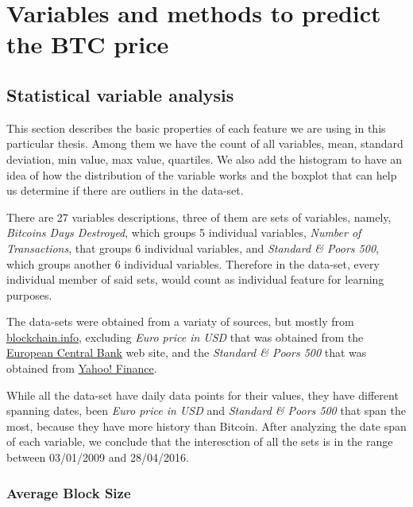 
\chapter{Variables and methods to predict the BTC price} %

\label{ch:variables}


\section{Statistical variable analysis}
\label{sec:stat-var-analysis}

This section describes the basic properties of each feature we are
using in this particular thesis. Among them we have the count of all
variables, mean, standard deviation, min value, max value, quartiles.
We also add the histogram to have an idea of how the distribution of
the variable works and the boxplot that can help us determine if there
are outliers in the data-set.

There are 27 variables descriptions, three of them are sets of
variables, namely, \textit{Bitcoins Days Destroyed}, which groups 5
individual variables, \textit{Number of Transactions}, that groups 6
individual variables, and \textit{Standard \& Poors 500}, which groups
another 6 individual variables. Therefore in the data-set, every
individual member of said sets, would count as individual feature for
learning purposes.

The data-sets were obtained from a variaty of sources, but mostly from
\href{https://blockchain.info/charts}{blockchain.info}, excluding
\textit{Euro price in USD} that was obtained from the
\href{https://www.ecb.europa.eu/stats/exchange/eurofxref/html/index.en.html}{European
  Central Bank} web site, and the \textit{Standard \& Poors 500} that
was obtained from
\href{https://finance.yahoo.com/q/hp?s=^GSPC\&a=00\&b=3\&c=1950\&d=05\&e=8\&f=2016\&g=d}{Yahoo!
  Finance}.

While all the data-set have daily data points for their values, they
have different spanning dates, been \textit{Euro price in USD} and
\textit{Standard \& Poors 500} that span the most, because they have
more history than Bitcoin. After analyzing the date span of each
variable, we conclude that the interesction of all the sets is in the
range between 03/01/2009 and 28/04/2016.

\subsection{Average Block Size}
\label{sec:avg-block-size}

